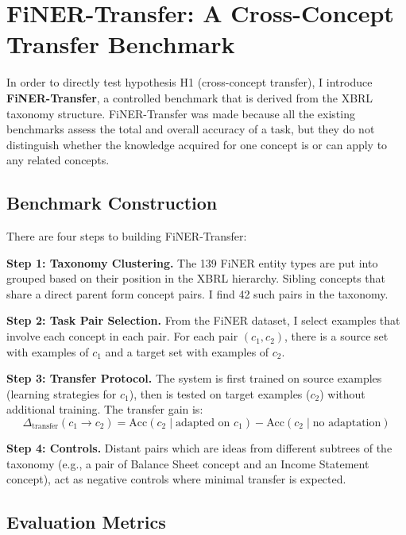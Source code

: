 \documentclass[12pt,a4paper,oneside]{article}
\begin{document}
\section{FiNER-Transfer: A Cross-Concept Transfer Benchmark}
\label{sec:finer-transfer}

In order to directly test hypothesis H1 (cross-concept transfer), I introduce \textbf{FiNER-Transfer}, a controlled benchmark that is derived from the XBRL taxonomy structure. FiNER-Transfer was made because all the existing benchmarks assess the total and overall accuracy of a task, but they do not distinguish whether the knowledge acquired for one concept is or can apply to any related concepts.

\subsection{Benchmark Construction}

There are four steps to building FiNER-Transfer:

\textbf{Step 1: Taxonomy Clustering.} The 139 FiNER entity types are put into grouped based on their position in the XBRL hierarchy. Sibling concepts that share a direct parent form concept pairs. I find 42 such pairs in the taxonomy.

\textbf{Step 2: Task Pair Selection.} From the FiNER dataset, I select examples that involve each concept in each pair. For each pair $(c_1, c_2)$, there is a source set with examples of $c_1$ and a target set with examples of $c_2$.

\textbf{Step 3: Transfer Protocol.} The system is first trained on source examples (learning strategies for $c_1$), then is tested on target examples ($c_2$) without additional training. The transfer gain is:
\begin{equation}
\Delta_{\text{transfer}}(c_1 \rightarrow c_2) = \text{Acc}(c_2 \mid \text{adapted on } c_1) - \text{Acc}(c_2 \mid \text{no adaptation})
\end{equation}

\textbf{Step 4: Controls.} Distant pairs which are ideas from different subtrees of the taxonomy (e.g., a pair of Balance Sheet concept and an Income Statement concept), act as negative controls where minimal transfer is expected.

\subsection{Evaluation Metrics}
\end{document}
